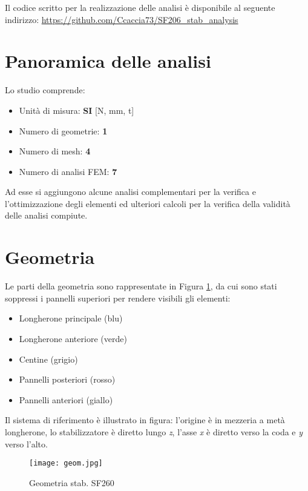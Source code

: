 \documentclass[
10pt, %
a4paper, %
oneside, %
headinclude,footinclude, %
BCOR5mm, %
]{scrartcl}
\begin{document}
Il codice scritto per la realizzazione delle analisi \`{e} disponibile al seguente indirizzo: \url{https://github.com/Ccaccia73/SF206_stab_analysis}



\section{Panoramica delle analisi}

Lo studio comprende:

\begin{itemize}
	\item Unit\`{a} di misura: \textbf{SI} [N, mm, t]
	\item Numero di geometrie: \textbf{1}
	\item Numero di mesh: \textbf{4}
	\item Numero di analisi FEM: \textbf{7}
\end{itemize}

Ad esse si aggiungono alcune analisi complementari per la verifica e l'ottimizzazione degli elementi ed ulteriori calcoli per la verifica della validit\`{a} delle analisi compiute.


\section{Geometria}

Le parti della geometria sono rappresentate in Figura \ref{fig:geom}, da cui sono stati soppressi i pannelli superiori per rendere visibili gli elementi:

\begin{itemize}
	\item Longherone principale (blu)
	\item Longherone anteriore (verde)
	\item Centine (grigio)
	\item Pannelli posteriori (rosso)
	\item Pannelli anteriori (giallo)
\end{itemize}

Il sistema di riferimento \`{e} illustrato in figura: l'origine \`{e} in mezzeria a met\`{a} longherone, lo stabilizzatore \`{e} diretto lungo \emph{z}, l'asse \emph{x} \`{e} diretto verso la coda e \emph{y} verso l'alto.

\begin{figure}[tb]
	\centering 
	\texttt{[image: geom.jpg]} 
	\caption[Geometria stabilizzatore]{Geometria stab. SF260} %
	\label{fig:geom} 
\end{figure}
\end{document}
